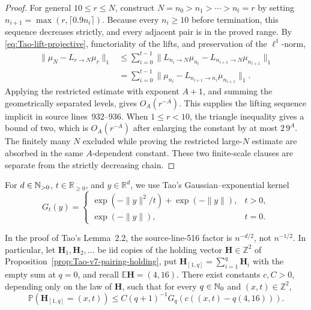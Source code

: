 \begin{proof}
For general \(10\le r\le N\), construct
\(N=n_0>n_1>\cdots>n_t=r\) by setting
\(n_{i+1}=\max(r,\lceil0.9n_i\rceil)\).  Because every \(n_i\ge10\)
before termination, this sequence decreases strictly, and every adjacent
pair is in the proved range.  By \eqref{eq:Tao-lift-projective}, functoriality of the
lifts, and preservation of the \(\ell^1\)-norm,
\[
\begin{aligned}
 \|\mu_N-L_{r\to N}\mu_r\|_1
 &\le\sum_{i=0}^{t-1}
 \|L_{n_i\to N}\mu_{n_i}
       -L_{n_{i+1}\to N}\mu_{n_{i+1}}\|_1\\
 &=\sum_{i=0}^{t-1}
 \|\mu_{n_i}-L_{n_{i+1}\to n_i}\mu_{n_{i+1}}\|_1.
\end{aligned}
\]
Applying the restricted estimate with exponent \(A+1\), and summing the
geometrically separated levels, gives \(O_A(r^{-A})\).  This supplies the
lifting sequence implicit in source lines~932--936.  When \(1\le r<10\),
the triangle inequality gives a bound of two, which is
\(O_A(r^{-A})\) after enlarging the constant by at most \(2\,9^A\).
The finitely many \(N\) excluded while proving the restricted large-\(N\)
estimate are absorbed in the same \(A\)-dependent constant.  These two
finite-scale clauses are separate from the strictly decreasing chain.
\end{proof}

For \(d\in\mathbb{N}_{>0}\), \(t\in\mathbb R_{\ge0}\), and \(y\in\mathbb R^d\),
we use Tao's Gaussian--exponential kernel
\begin{equation}
\label{eq:Tao-G-kernel}
 G_t(y)=
 \begin{cases}
  \exp(-\|y\|^2/t)+\exp(-\|y\|),&t>0,\\
  \exp(-\|y\|),&t=0.
 \end{cases}
\end{equation}

\begin{lemma}
\label{lem:Tao-v7-local-factor}
In the proof of Tao's Lemma~2.2, the source-line-516 factor is
\(n^{-d/2}\), not \(n^{-1/2}\).  In particular, let
\(\mathbf H_1,\mathbf H_2,\ldots\) be iid copies of the holding vector
\(\mathbf H\in\mathbb Z^2\) of
Proposition~\ref{prop:Tao-v7-pairing-holding}, put
\(\mathbf H_{[1,q]}=\sum_{i=1}^q\mathbf H_i\) with the empty sum at
\(q=0\), and recall \(\mathbb E\mathbf H=(4,16)\).  There exist constants
\(c,C>0\), depending only on the law of \(\mathbf H\), such that for every
\(q\in\mathbb{N}_{0}\) and \((x,t)\in\mathbb Z^2\),
\[
 \mathbb P(\mathbf H_{[1,q]}=(x,t))
 \le C(q+1)^{-1}G_q(c((x,t)-q(4,16))).
\]
\end{lemma}

